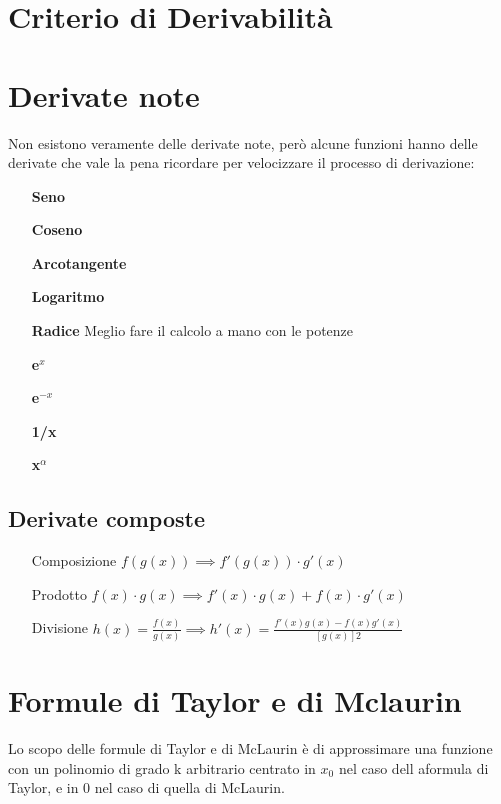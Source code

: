 \documentclass[12pt, a4paper, openany]{book}
\begin{document}
	\section{Criterio di Derivabilità}
	\section{Derivate note}
	Non esistono veramente delle derivate note, però alcune funzioni hanno delle derivate che vale la pena ricordare per velocizzare il processo di derivazione:

	\begin{itemize}
		\item[\textbf{Seno}] 
		\item[\textbf{Coseno}] 
		\item[\textbf{Arcotangente}] 
		\item[\textbf{Logaritmo}] 
		\item[\textbf{Radice}] Meglio fare il calcolo a mano con le potenze%
		\item[\textbf{e$^x$}] 
		\item[\textbf{e$^{-x}$}] 
		\item[\textbf{1/x}] 
		\item[\textbf{x$^\alpha$}] 
	\end{itemize}
	\subsection*{Derivate composte}
	\begin{itemize}
		\item[Composizione] $f(g(x)) \implies f'(g(x)) \cdot g'(x)$
		\item[Prodotto] $f(x) \cdot g(x) \implies f'(x) \cdot g(x) + f(x) \cdot g'(x)$
  		\item[Divisione] $h(x)=\frac{f(x)}{g(x)} \implies h'(x) = \frac{f'(x)g(x) - f(x)g'(x)}{[g(x)]2}$
	\end{itemize}



	\section{Formule di Taylor e di Mclaurin}
	Lo scopo delle formule di Taylor e di McLaurin è di approssimare una funzione con un polinomio di grado k arbitrario centrato in $x_0$ nel caso dell aformula di Taylor,
	e in 0 nel caso di quella di McLaurin.
\end{document}

